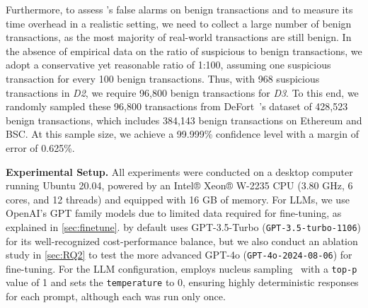 Furthermore, to assess \name's false alarms on benign transactions and to measure its time overhead in a realistic setting, we need to collect a large number of benign transactions, as the most majority of real-world transactions are still benign.
In the absence of empirical data on the ratio of suspicious to benign transactions, we adopt a conservative yet reasonable ratio of 1:100, assuming one suspicious transaction for every 100 benign transactions.
Thus, with 968 suspicious transactions in \textit{D2}, we require 96,800 benign transactions for \textit{D3}.
To this end, we randomly sampled these 96,800 transactions from DeFort~\cite{DeFort24}’s dataset of 428,523 benign transactions, which includes 384,143 benign transactions on Ethereum and BSC.
At this sample size, we achieve a 99.999\% confidence level with a margin of error of 0.625\%.




\noindent
\textbf{Experimental Setup.}
All experiments were conducted on a desktop computer running Ubuntu 20.04, powered by an Intel® Xeon® W-2235 CPU (3.80 GHz, 6 cores, and 12 threads) and equipped with 16 GB of memory.
For LLMs, we use OpenAI's GPT family models due to limited data required for fine-tuning, as explained in \mysec\ref{sec:finetune}.
\name by default uses GPT-3.5-Turbo (\texttt{GPT-3.5-turbo-1106}) for its well-recognized cost-performance balance, but we also conduct an ablation study in \mysec\ref{sec:RQ2} to test the more advanced GPT-4o (\texttt{GPT-4o-2024-08-06}) for fine-tuning.
For the LLM configuration, \name employs nucleus sampling~\cite{holtzman2019curious} with a \texttt{top-p} value of 1 and sets the \texttt{temperature} to 0, ensuring highly deterministic responses for each prompt, although each was run only once.



